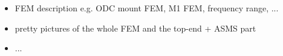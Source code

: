 
\begin{itemize}
\item FEM description e.g. ODC mount FEM, M1 FEM, frequency range, ...
\item pretty pictures of the whole FEM and the top-end + ASMS part
\item ...
\end{itemize}